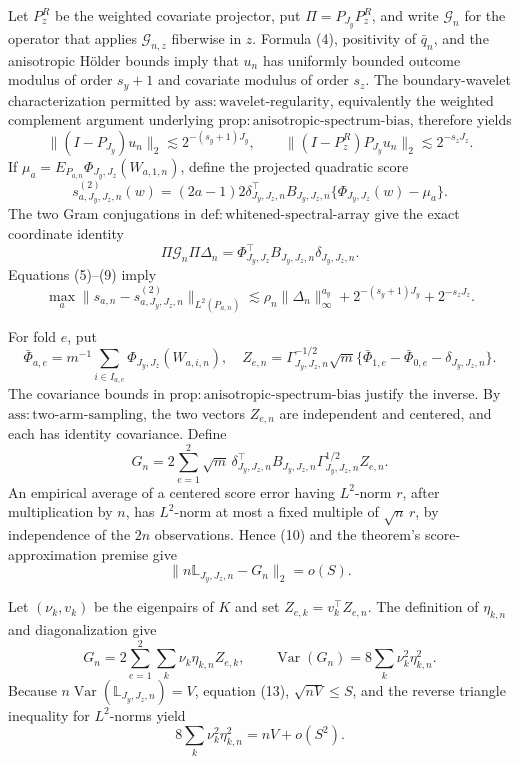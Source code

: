 Let \(P_z^R\) be the weighted covariate projector, put \(\Pi=P_{J_y}P_z^R\), and write \(\mathcal G_n\) for the operator that applies \(\mathcal G_{n,z}\) fiberwise in \(z\). Formula (4), positivity of \(\bar q_n\), and the anisotropic H\"older bounds imply that \(u_n\) has uniformly bounded outcome modulus of order \(s_y+1\) and covariate modulus of order \(s_z\). The boundary-wavelet characterization permitted by \(\mathrm{ass{:}wavelet\text{-}regularity}\), equivalently the weighted complement argument underlying \(\mathrm{prop{:}anisotropic\text{-}spectrum\text{-}bias}\), therefore yields
\[
\|(I-P_{J_y})u_n\|_2\lesssim2^{-(s_y+1)J_y},
\qquad
\|(I-P_z^R)P_{J_y}u_n\|_2\lesssim2^{-s_zJ_z}. \tag{8}
\]
If \(\mu_a=E_{P_{a,n}}\Phi_{J_y,J_z}(W_{a,1,n})\), define the projected quadratic score
\[
s^{(2)}_{a,J_y,J_z,n}(w)
=(2a-1)2\delta_{J_y,J_z,n}^{\top}B_{J_y,J_z,n}
\{\Phi_{J_y,J_z}(w)-\mu_a\}.
\]
The two Gram conjugations in \(\mathrm{def{:}whitened\text{-}spectral\text{-}array}\) give the exact coordinate identity
\[
\Pi\mathcal G_n\Pi\Delta_n
=\Phi_{J_y,J_z}^{\top}B_{J_y,J_z,n}\delta_{J_y,J_z,n}. \tag{9}
\]
Equations (5)--(9) imply
\[
\max_a\|s_{a,n}-s^{(2)}_{a,J_y,J_z,n}\|_{L^2(P_{a,n})}
\lesssim
\rho_n\|\Delta_n\|_\infty^{a_y}
+2^{-(s_y+1)J_y}+2^{-s_zJ_z}. \tag{10}
\]

For fold \(e\), put
\[
\bar\Phi_{a,e}=m^{-1}\sum_{i\in I_{a,e}}\Phi_{J_y,J_z}(W_{a,i,n}),
\quad
Z_{e,n}=\Gamma_{J_y,J_z,n}^{-1/2}\sqrt m
\{\bar\Phi_{1,e}-\bar\Phi_{0,e}-\delta_{J_y,J_z,n}\}. \tag{11}
\]
The covariance bounds in \(\mathrm{prop{:}anisotropic\text{-}spectrum\text{-}bias}\) justify the inverse. By \(\mathrm{ass{:}two\text{-}arm\text{-}sampling}\), the two vectors \(Z_{e,n}\) are independent and centered, and each has identity covariance. Define
\[
G_n=2\sum_{e=1}^2\sqrt m\,
\delta_{J_y,J_z,n}^{\top}B_{J_y,J_z,n}
\Gamma_{J_y,J_z,n}^{1/2}Z_{e,n}. \tag{12}
\]
An empirical average of a centered score error having \(L^2\)-norm \(r\), after multiplication by \(n\), has \(L^2\)-norm at most a fixed multiple of \(\sqrt n\,r\), by independence of the \(2n\) observations. Hence (10) and the theorem's score-approximation premise give
\[
\|n\mathbb L_{J_y,J_z,n}-G_n\|_2=o(S). \tag{13}
\]

Let \((\nu_k,v_k)\) be the eigenpairs of \(K\) and set \(Z_{e,k}=v_k^{\top}Z_{e,n}\). The definition of \(\eta_{k,n}\) and diagonalization give
\[
G_n=2\sum_{e=1}^2\sum_k\nu_k\eta_{k,n}Z_{e,k},
\qquad
\operatorname{Var}(G_n)=8\sum_k\nu_k^2\eta_{k,n}^2. \tag{14}
\]
Because \(n\operatorname{Var}(\mathbb L_{J_y,J_z,n})=V\), equation (13), \(\sqrt{nV}\le S\), and the reverse triangle inequality for \(L^2\)-norms yield
\[
8\sum_k\nu_k^2\eta_{k,n}^2=nV+o(S^2). \tag{15}
\]


